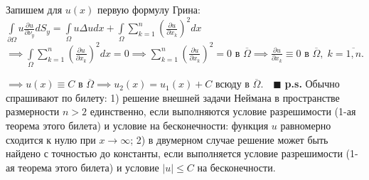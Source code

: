Запишем для $u(x)$ первую формулу Грина:
$\int\limits_{\partial \Omega} u \frac{\partial u}{\partial \nu_y} dS_y = \int\limits_{\Omega} u \Delta u dx + \int\limits_\Omega \sum_{k=1}^n \left ( \frac{\partial u}{\partial x_k} \right )^2 dx$$
$$\implies \int\limits_\Omega \sum_{k=1}^n \left ( \frac{\partial u}{\partial x_k} \right )^2 dx = 0 \implies \sum_{k=1}^n \left ( \frac{\partial u}{\partial x_k} \right )^2 = 0 \text{ в } \overline{\Omega} \implies \frac{\partial u}{\partial x_k} \equiv 0 \text{ в } \overline{\Omega}, \; k = \overline{1, n}.$

$\implies u(x) \equiv C$ в $\overline{\Omega} \implies u_2(x) = u_1(x) + C$ всюду в $\overline{\Omega}. \quad \blacksquare$
\newline \newline
\textbf{p.s.} Обычно спрашивают по билету: 1) решение внешней задачи Неймана в пространстве размерности $n > 2$ единственно, если выполняются условие разрешимости (1-ая теорема этого билета) и условие на бесконечности: функция $u$ равномерно сходится к нулю при $x \rightarrow \infty$; 2) в двумерном случае решение может быть найдено с точностью до константы, если выполняется условие разрешимости (1-ая теорема этого билета) и условие $|u| \leq C$ на бесконечности.

